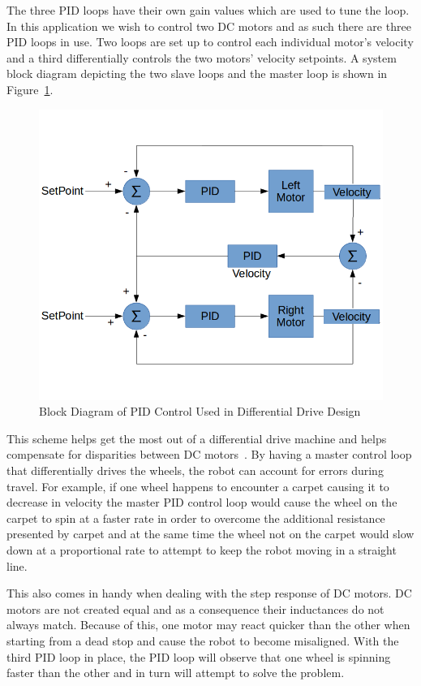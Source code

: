 \documentclass[12pt,oneside,final]{siuethesis}
\theoremstyle{definition}
\begin{document}
The three PID loops have their own gain values which are used to tune the loop. In this application we wish to control two DC motors and as such there are three PID loops in use. Two loops are set up to control each individual motor's velocity and a third differentially controls the two motors' velocity setpoints. A system block diagram depicting the two slave loops and the master loop is shown in Figure~\ref{fig:PID_Dia}. 

\begin{figure}[htbp!]
 \centering
 \includegraphics[scale=.45,keepaspectratio=true]{./images_ch3/PID_diff_flow.png}
 \caption{Block Diagram of PID Control Used in Differential Drive Design}
 \label{fig:PID_Dia}
\end{figure}

This scheme helps get the most out of a differential drive machine and helps compensate for disparities between DC motors~\cite{PID_Diff}. By having a master control loop that differentially drives the wheels, the robot can account for errors during travel. For example, if one wheel happens to encounter a carpet causing it to decrease in velocity the master PID control loop would cause the wheel on the carpet to spin at a faster rate in order to overcome the additional resistance presented by carpet and at the same time the wheel not on the carpet would slow down at a proportional rate to attempt to keep the robot moving in a straight line. 

This also comes in handy when dealing with the step response of DC motors. DC motors are not created equal and as a consequence their inductances do not always match. Because of this, one motor may react quicker than the other when starting from a dead stop and cause the robot to become misaligned. With the third PID loop in place, the PID loop will observe that one wheel is spinning faster than the other and in turn will attempt to solve the problem. 
\end{document}
